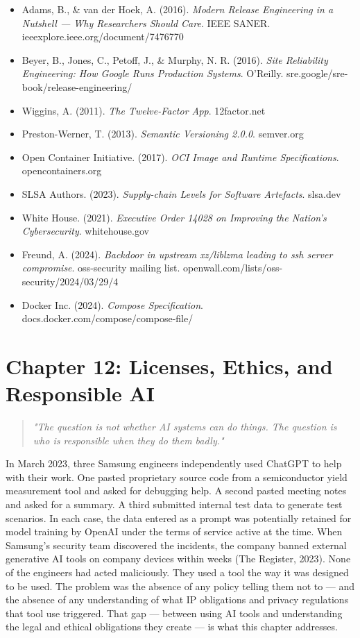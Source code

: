 \documentclass[11pt,a4paper]{book}
\begin{document}
\begin{itemize}
  \item Adams, B., \& van der Hoek, A. (2016). \textit{Modern Release Engineering in a Nutshell --- Why Researchers Should Care}. IEEE SANER. ieeexplore.ieee.org/document/7476770
  \item Beyer, B., Jones, C., Petoff, J., \& Murphy, N. R. (2016). \textit{Site Reliability Engineering: How Google Runs Production Systems}. O'Reilly. sre.google/sre-book/release-engineering/
  \item Wiggins, A. (2011). \textit{The Twelve-Factor App}. 12factor.net
  \item Preston-Werner, T. (2013). \textit{Semantic Versioning 2.0.0}. semver.org
  \item Open Container Initiative. (2017). \textit{OCI Image and Runtime Specifications}. opencontainers.org
  \item SLSA Authors. (2023). \textit{Supply-chain Levels for Software Artefacts}. slsa.dev
  \item White House. (2021). \textit{Executive Order 14028 on Improving the Nation's Cybersecurity}. whitehouse.gov
  \item Freund, A. (2024). \textit{Backdoor in upstream xz/liblzma leading to ssh server compromise}. oss-security mailing list. openwall.com/lists/oss-security/2024/03/29/4
  \item Docker Inc. (2024). \textit{Compose Specification}. docs.docker.com/compose/compose-file/
\end{itemize}


\chapter{Chapter 12: Licenses, Ethics, and Responsible AI}

\begin{quote}
\textit{\textit{"The question is not whether AI systems can do things. The question is who is responsible when they do them badly."}}
\end{quote}

\medskip

In March 2023, three Samsung engineers independently used ChatGPT to help with their work. One pasted proprietary source code from a semiconductor yield measurement tool and asked for debugging help. A second pasted meeting notes and asked for a summary. A third submitted internal test data to generate test scenarios. In each case, the data entered as a prompt was potentially retained for model training by OpenAI under the terms of service active at the time. When Samsung's security team discovered the incidents, the company banned external generative AI tools on company devices within weeks (The Register, 2023). None of the engineers had acted maliciously. They used a tool the way it was designed to be used. The problem was the absence of any policy telling them not to --- and the absence of any understanding of what IP obligations and privacy regulations that tool use triggered. That gap --- between using AI tools and understanding the legal and ethical obligations they create --- is what this chapter addresses.
\end{document}
